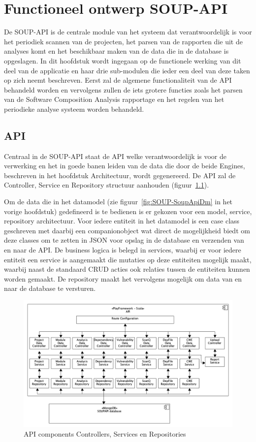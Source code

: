 
\chapter{Functioneel ontwerp SOUP-API}\label{ch:impl soup api}
De SOUP-API is de centrale module van het systeem dat verantwoordelijk is voor het periodiek scannen van de projecten, het parsen van de rapporten die uit de analyses komt en het beschikbaar maken van de data die in de database is opgeslagen. In dit hoofdstuk wordt ingegaan op de functionele werking van dit deel van de applicatie en haar drie sub-modulen die ieder een deel van deze taken op zich neemt beschreven. Eerst zal de algemene functionaliteit van de API behandeld worden en vervolgens zullen de iets grotere functies zoals het parsen van de Software Composition Analysis rapportage en het regelen van het periodieke analyse systeem worden behandeld.


\section{API}\label{sec:api2}
Centraal in de SOUP-API staat de API welke verantwoordelijk is voor de verwerking en het in goede banen leiden van de data die door de beide Engines, beschreven in het hoofdstuk Architectuur, wordt gegenereerd. De API zal de Controller, Service en Repository structuur aanhouden (figuur~\ref{fig:API components}).

Om de data die in het datamodel (zie figuur~\ref{fig:SOUP-SoupApiDm} in het vorige hoofdstuk) gedefineerd is te bedienen is er gekozen voor een model, service, repository architectuur. Voor iedere entiteit in het datamodel is een case class geschreven met daarbij een companionobject wat direct de mogelijkheid biedt om deze classes om te zetten in JSON voor opslag in de database en verzenden van en naar de API. De business logica is belegd in services, waarbij er voor iedere entiteit een service is aangemaakt die mutaties op deze entiteiten mogelijk maakt, waarbij naast de standaard CRUD acties ook relaties tussen de entiteiten kunnen worden gemaakt. De repository maakt het vervolgens mogelijk om data van en naar de database te versturen.

\begin{figure}[bth]
    \myfloatalign
    \includegraphics[width=12cm]{gfx/umlet/exports/API-ComponentsDiagram}
    \caption{API components Controllers, Services en Repositories}
    \label{fig:API components}
\end{figure}



